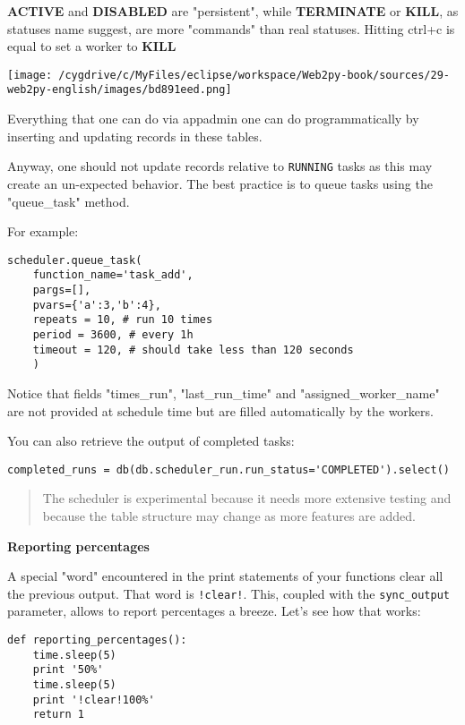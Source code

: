 \documentclass[justified,sixbynine,notoc]{tufte-book}
\def\ft{\small\tt}
\begin{document}
\begin{fullwidth}
{\bf ACTIVE} and {\bf DISABLED} are "persistent", while {\bf TERMINATE} or {\bf KILL}, as statuses
name suggest, are more "commands" than real statuses.
Hitting ctrl+c is equal to set a worker to {\bf KILL}


\goodbreak\begin{center}\texttt{[image: /cygdrive/c/MyFiles/eclipse/workspace/Web2py-book/sources/29-web2py-english/images/bd891eed.png]}\end{center}


Everything that one can do via appadmin one can do programmatically by inserting and updating records in these tables.

Anyway, one should not update records relative to {\ft RUNNING} tasks as this may create an un-expected behavior. The best practice is to queue tasks using the "queue\_task" method.

For example:

\begin{lstlisting}
scheduler.queue_task(
    function_name='task_add',
    pargs=[],
    pvars={'a':3,'b':4},
    repeats = 10, # run 10 times
    period = 3600, # every 1h
    timeout = 120, # should take less than 120 seconds
    )
\end{lstlisting}

Notice that fields "times\_run", "last\_run\_time" and "assigned\_worker\_name" are not provided at schedule time but are filled automatically by the workers.

You can also retrieve the output of completed tasks:

\begin{lstlisting}
completed_runs = db(db.scheduler_run.run_status='COMPLETED').select()
\end{lstlisting}

\begin{quote}The scheduler is experimental because it needs more extensive testing and because the table structure may change as more features are added.\end{quote}
{\bf Reporting percentages}

A special "word" encountered in the print statements of your functions clear all
the previous output. That word is {\ft !clear!}.
This, coupled with the {\ft sync\_output} parameter, allows to report percentages
a breeze. Let's see how that works:

\begin{lstlisting}
def reporting_percentages():
    time.sleep(5)
    print '50%'
    time.sleep(5)
    print '!clear!100%'
    return 1
\end{lstlisting}


\end{fullwidth}
\end{document}
